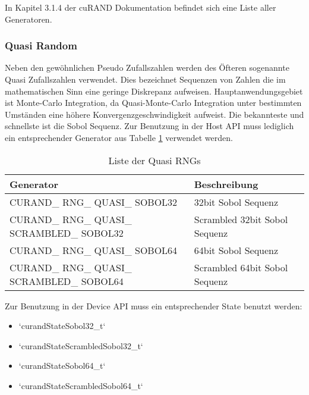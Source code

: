             In Kapitel 3.1.4 der cuRAND Dokumentation befindet sich eine Liste aller Generatoren. \autocite{curandDoc}
					
            \subsubsection{Quasi Random} 
            Neben den gewöhnlichen Pseudo Zufallszahlen werden des Öfteren sogenannte Quasi Zufallszahlen verwendet. Dies bezeichnet Sequenzen von Zahlen die im mathematischen Sinn eine geringe Diskrepanz aufweisen. Hauptanwendungsgebiet ist Monte-Carlo Integration, da Quasi-Monte-Carlo Integration unter bestimmten Umständen eine höhere Konvergenzgeschwindigkeit aufweist. Die bekannteste und schnellste ist die Sobol Sequenz. Zur Benutzung in der Host \Gls{API} muss lediglich ein entsprechender Generator aus Tabelle \ref{tab5:qrng} verwendet werden.
            \begin{table}[h]
                \centering
                \begin{tabular}{ll}
                    \toprule
                    \textbf{Generator} & \textbf{Beschreibung} \\ \midrule
                    CURAND\_ RNG\_ QUASI\_ SOBOL32     & 32bit Sobol Sequenz \\
                    CURAND\_ RNG\_ QUASI\_ SCRAMBLED\_ SOBOL32 & Scrambled 32bit Sobol Sequenz \\
                    CURAND\_ RNG\_ QUASI\_ SOBOL64 & 64bit Sobol Sequenz \\
                    CURAND\_ RNG\_ QUASI\_ SCRAMBLED\_ SOBOL64 & Scrambled 64bit Sobol Sequenz \\ \bottomrule
                \end{tabular}
                \caption{Liste der Quasi RNGs}
                \label{tab5:qrng}
            \end{table}
			
            Zur Benutzung in der Device \Gls{API} muss ein entsprechender State benutzt werden:
            \begin{itemize}
                \item \li`curandStateSobol32_t`
                \item \li`curandStateScrambledSobol32_t`
                \item \li`curandStateSobol64_t`
                \item \li`curandStateScrambledSobol64_t`
            \end{itemize}
			
